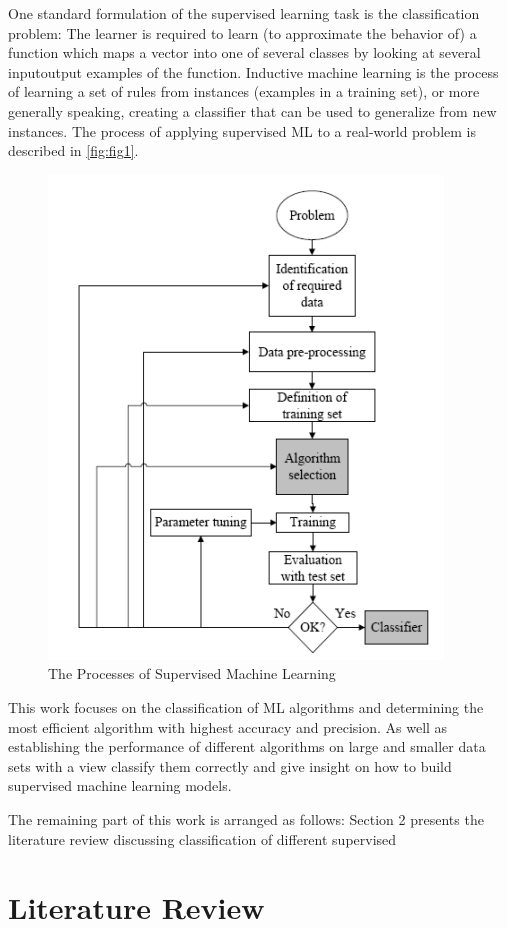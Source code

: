 \documentclass[pdflatex,sn-nature,Numbered]{sn-jnl}%
\theoremstyle{thmstyleone}%
\theoremstyle{thmstyletwo}%
\theoremstyle{thmstylethree}%
\begin{document}
One standard formulation of the supervised
learning task is the classification problem: The
learner is required to learn (to approximate the
behavior of) a function which maps a vector into
one of several classes by looking at several inputoutput examples of the function. Inductive machine
learning is the process of learning a set of rules from
instances (examples in a training set), or more
generally speaking, creating a classifier that can be
used to generalize from new instances. The process
of applying supervised ML to a real-world problem
is described in \autoref{fig:fig1}.

\begin{figure}[h]
    \centering
    \includegraphics[width=0.5\linewidth]{flowchart.png}
    \centering
    \caption{The Processes of Supervised Machine Learning}
    \label{fig:fig1}
\end{figure}

This work focuses on the classification of ML 
algorithms and determining the most efficient 
algorithm with highest accuracy and precision. As 
well as establishing the performance of different algorithms on large and smaller data sets with a 
view classify them correctly and give insight on 
how to build supervised machine learning models. 

The remaining part of this work is arranged as 
follows: Section 2 presents the literature review 
discussing classification of different supervised 

\section{Literature Review} \label{sec2}
\end{document}
